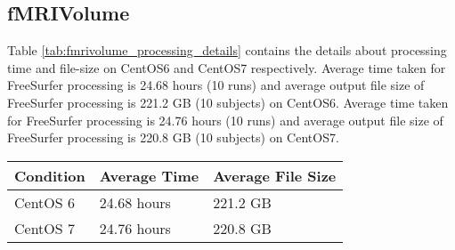 
\subsection{fMRIVolume}
Table \ref{tab:fmrivolume_processing_details} contains the details about processing time and file-size on CentOS6 and CentOS7 respectively.
Average time taken for FreeSurfer processing is 24.68 hours (10 runs) and average output file size of FreeSurfer processing is 221.2 GB (10 subjects) on CentOS6.
Average time taken for FreeSurfer processing is 24.76 hours (10 runs) and average output file size of FreeSurfer processing is 220.8 GB (10 subjects) on CentOS7.

\begin{center}
\begin{tabular}{ | l | l | l | }
  \hline
    \textbf{Condition} & \textbf{Average Time} & \textbf{Average File Size} \\
  \hline
    CentOS 6 & 24.68 hours & 221.2 GB \\
  \hline
    CentOS 7 & 24.76 hours & 220.8 GB \\
  \hline
\end{tabular}
\label{tab:fmrivolume_processing_details}
\end{center}



